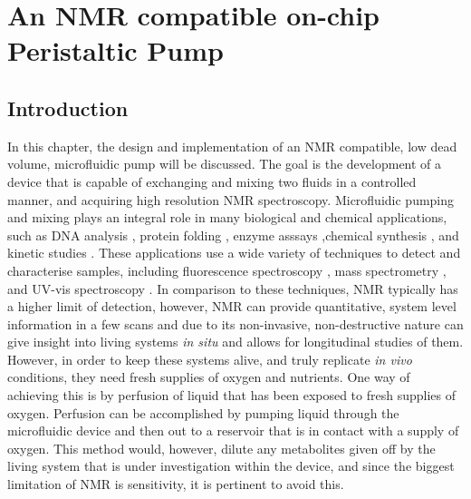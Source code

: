
\chapter{An NMR compatible on-chip Peristaltic Pump}\label{Chapter:Peristaltics}

\section{Introduction}

In this chapter, the design and implementation of an NMR compatible, low dead volume,
microfluidic pump will be discussed. The goal is the development of a device that is
capable of exchanging and mixing two fluids in a controlled manner, and acquiring high
resolution NMR spectroscopy. Microfluidic pumping  and mixing plays an integral role in
many biological and chemical applications, such as DNA analysis \citep{RN74, RN75}, protein
folding \citep{RN76}, enzyme asssays \citep{RN77, RN78},chemical synthesis \citep{RN79,RN80},
and kinetic studies \citep{RN81, RN82}. These applications use a wide variety of techniques to
detect and characterise samples, including fluorescence spectroscopy \citep{RN75}, mass spectrometry
\citep{RN79}, and UV-vis spectroscopy \citep{RN82}. In comparison to these techniques, NMR typically has
a higher limit of detection, however, NMR can provide quantitative, system level information in a few scans
and due to its non-invasive, non-destructive nature can give insight into living
systems \textit{in situ} and allows for longitudinal studies of them. However, in order to
keep these systems alive, and truly replicate \textit{in vivo} conditions, they need fresh supplies
of oxygen and nutrients. One way of achieving this is by perfusion of
liquid that has been exposed to fresh supplies of oxygen. Perfusion can be accomplished by
pumping liquid through the microfluidic device and then out to a reservoir that is in
contact with a supply of oxygen. This method would, however, dilute any metabolites
given off by the living system that is under investigation within the device, and
since the biggest limitation of NMR is sensitivity, it is pertinent to avoid this.

